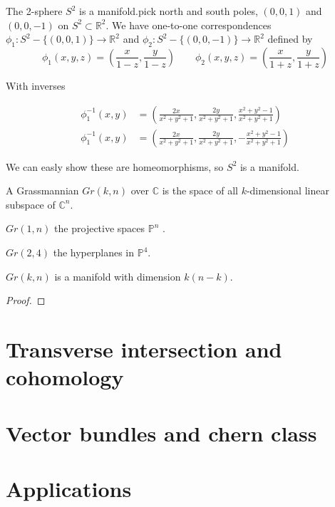 \documentclass{article}
\begin{document}
\begin{eg}
    The 2-sphere $S^{2}$ is a manifold.pick north and south poles, $(0,0,1)$ 
    and $(0,0,-1)$ on $S^{2} \subset \mathbb{R}^{2}$. We have one-to-one correspondences
    $\phi_{1} : S^{2}- \{(0,0,1)\} \longrightarrow \mathbb{R}^{2} $ and 
    $\phi_{2} : S^{2}- \{(0,0,-1)\} \longrightarrow \mathbb{R}^{2}$ defined by\\
    
    \[
    \phi_{1}(x,y,z) = (\frac{x}{1-z},\frac{y}{1-z}) \qquad 
    \phi_{2}(x,y,z) = (\frac{x}{1+z},\frac{y}{1+z})
    \]

    With inverses

    \begin{align*}
    \phi_{1}^{-1}(x,y) & = {}(\frac{2x}{x^{2}+y^{2}+1},\frac{2y}{x^{2}+y^{2}+1},\frac{x^{2}+y^{2}-1}{x^{2}+y^{2}+1}) \\
    \phi_{1}^{-1}(x,y) & = {}(\frac{2x}{x^{2}+y^{2}+1},\frac{2y}{x^{2}+y^{2}+1},-\frac{x^{2}+y^{2}-1}{x^{2}+y^{2}+1})
    \end{align*}
 
    We can easly show these are homeomorphisms, so $S^{2}$ is a manifold.
\end{eg}


\begin{df}
A Grassmannian $Gr(k,n)$ over $\mathbb{C}$ is the space of all $k$-dimensional 
linear subspace of $\mathbb{C}^{n}$. 
\end{df}

\begin{eg}
$Gr(1,n)$ the projective spaces $\mathbb{P}^{n}$ .
\end{eg}

\begin{eg}
$Gr(2,4)$ the hyperplanes in $\mathbb{P}^{4}$.
\end{eg}

\begin{thm}
$Gr(k,n)$ is a manifold with dimension $k(n-k) $. 
\end{thm}
\begin{proof}

\end{proof}

\newpage
\section{Transverse intersection and cohomology}

\newpage
\section{Vector bundles and chern class}

\newpage
\section{Applications}
\end{document}
